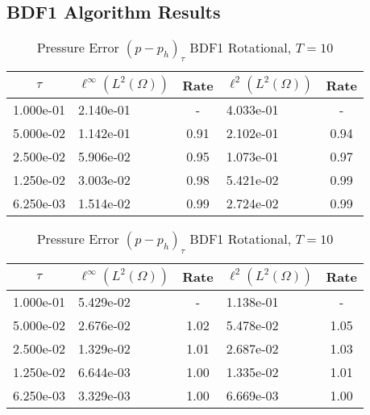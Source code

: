 \documentclass[letterpaper]{erdc}
\begin{document}
\subsection{BDF1 Algorithm Results}
\begin{table}[h!]
  \parbox{.45\linewidth}{
  \tiny
  \centering
    \caption{Density Error $(\rho - \rho_h)_{\tau}$ BDF1 Rotational, $T=10$}
    \begin{tabular}{c|l|c|l|c}\label{table:firstconvergenceresult}
      $\tau$  & $\ell^{\infty}\left(L^2(\Omega)\right)$ &  Rate  &  $\ell^2\left(L^2(\Omega)\right)$  &  Rate\\
      \hline
      1.000e-01 & 2.140e-01 &   -  & 4.033e-01 &   - \\
      5.000e-02 & 1.142e-01 & 0.91 & 2.102e-01 & 0.94\\
      2.500e-02 & 5.906e-02 & 0.95 & 1.073e-01 & 0.97\\
      1.250e-02 & 3.003e-02 & 0.98 & 5.421e-02 & 0.99\\
      6.250e-03 & 1.514e-02 & 0.99 & 2.724e-02 & 0.99
    \end{tabular}
    }
    \hfill
    \parbox{.45\linewidth}{
      \tiny
      \centering
        \caption{Pressure Error $(p - p_h)_{\tau}$ BDF1 Rotational, $T=10$}
        \begin{tabular}{c|l|c|l|c}
          $\tau$ &  $\ell^{\infty}\left(L^2(\Omega)\right)$ &  Rate  &  $\ell^2\left(L^2(\Omega)\right)$  &  Rate\\
          \hline
          1.000e-01 & 5.429e-02 &   -  & 1.138e-01 &   - \\
          5.000e-02 & 2.676e-02 & 1.02 & 5.478e-02 & 1.05\\
          2.500e-02 & 1.329e-02 & 1.01 & 2.687e-02 & 1.03\\
          1.250e-02 & 6.644e-03 & 1.00 & 1.335e-02 & 1.01\\
          6.250e-03 & 3.329e-03 & 1.00 & 6.669e-03 & 1.00
        \end{tabular}
    }
\end{table}
\end{document}

